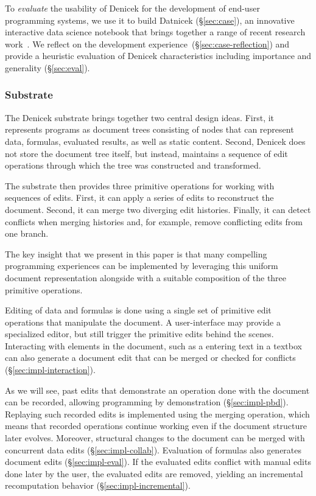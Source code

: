 \documentclass[sigconf,anonymous,screen]{acmart}
\begin{document}
To \emph{evaluate} the usability of Denicek for the development of end-user programming systems,
we use it to build Datnicek (\S\ref{sec:case}), an innovative interactive data science notebook
that brings together a range of recent research work~\cite{kandel-2011-wrangler,drossos-2020-wrex,petricek-2022-thegamma,adams-2025-grove}.
We reflect on the development experience~(\S\ref{sec:case-reflection}) and provide a heuristic
evaluation of Denicek characteristics including importance and generality (\S\ref{sec:eval}).

\subsubsection*{Substrate}
The Denicek substrate brings together two central design ideas. First, it represents programs as
document trees consisting of nodes that can represent data, formulas, evaluated results, as well as
static content. Second, Denicek does not store the document tree itself, but instead, maintains
a sequence of edit operations through which the tree was constructed and transformed.

The substrate then provides three primitive operations for working with sequences of edits.
First, it can apply a series of edits to reconstruct the document. Second, it can merge two
diverging edit histories. Finally, it can detect conflicts when merging histories and, for
example, remove conflicting edits from one branch.

The key insight that we present in this paper is that many compelling programming experiences can
be implemented by leveraging this uniform document representation alongside with a suitable
composition of the three primitive operations.

Editing of data and formulas is done using a single set of primitive edit operations that
manipulate the document. A user-interface may provide a specialized editor, but still
trigger the primitive edits behind the scenes. Interacting with elements in the document,
such as a entering text in a textbox can also generate a document edit that can be merged or checked
for conflicts (\S\ref{sec:impl-interaction}).

As we will see, past edits that demonstrate an operation done with the
document can be recorded, allowing programming by demonstration (\S\ref{sec:impl-pbd}).  Replaying
such recorded edits is implemented using the merging operation, which means that recorded operations
continue working even if the document structure later evolves. Moreover, structural changes to the
document can be merged with concurrent data edits  (\S\ref{sec:impl-collab}). Evaluation of formulas
also generates document edits (\S\ref{sec:impl-eval}). If the evaluated edits conflict with manual
edits done later by the user, the evaluated edits are removed, yielding an incremental
recomputation behavior (\S\ref{sec:impl-incremental}).
\end{document}
